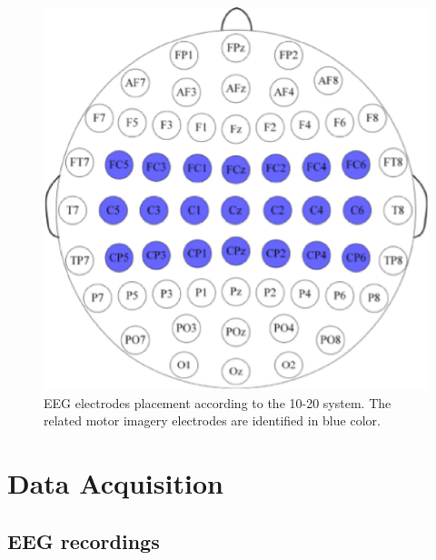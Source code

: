 \documentclass[journal,twocolumn]{IEEEtran}
\begin{document}
\begin{figure}[htbp]  %
  \centering  %
  \includegraphics[width=\linewidth]{figures/fig2.eps}  %
  \caption{EEG electrodes placement according to the 10-20 system. The related motor imagery electrodes are identified in blue color.}  %
  \label{fig:10-20}  %
\end{figure}


\section{Data Acquisition}
\subsection{EEG recordings} \cite{al2021deep}
\end{document}
